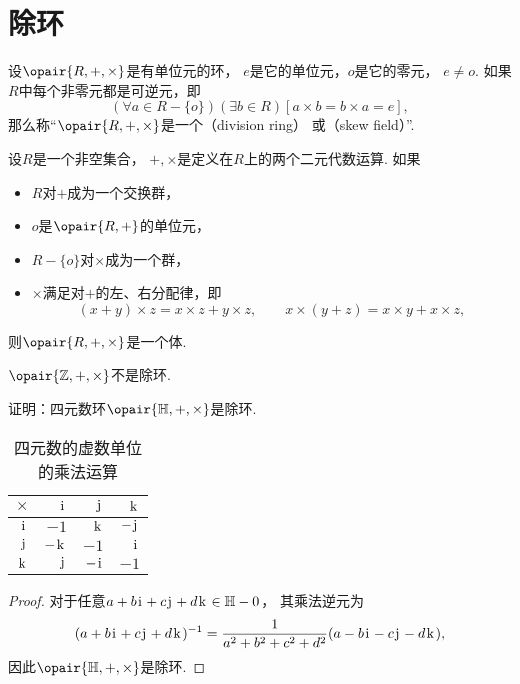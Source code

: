 \section{除环}
\begin{definition}
设\(\opair{R,+,\times}\)是有单位元的环，
\(e\)是它的单位元，\(o\)是它的零元，
\(e \neq o\).
如果\(R\)中每个非零元都是可逆元，即\begin{equation*}
	(\forall a \in R-\{o\})(\exists b \in R)[a \times b = b \times a = e],
\end{equation*}
那么称“\(\opair{R,+,\times}\)是一个（division ring）
或（skew field）”.
\end{definition}

\begin{theorem}
设\(R\)是一个非空集合，
\(+,\times\)是定义在\(R\)上的两个二元代数运算.
如果\begin{itemize}
	\item \(R\)对\(+\)成为一个交换群，
	\item \(o\)是\(\opair{R,+}\)的单位元，
	\item \(R-\{o\}\)对\(\times\)成为一个群，
	\item \(\times\)满足对\(+\)的左、右分配律，即\begin{equation*}
		(x + y) \times z = x \times z + y \times z,
		\qquad
		x \times (y + z) = x \times y + x \times z,
	\end{equation*}
\end{itemize}
则\(\opair{R,+,\times}\)是一个体.
\end{theorem}

\begin{example}
\(\opair{\mathbb{Z},+,\times}\)不是除环.
\end{example}

\begin{example}
证明：四元数环\(\opair{\mathbb{H},+,\times}\)是除环.
\begin{table}[hbt]
	\centering
	\begin{tabular}{r|*3r}
		\(\times\) & \(\kern1pt\mathrm{i}\kern1pt\) & \(\kern1pt\mathrm{j}\kern1pt\) & \(\kern1pt\mathrm{k}\kern1pt\) \\ \hline
		\(\kern1pt\mathrm{i}\kern1pt\) & \(-1\) & \(\kern1pt\mathrm{k}\kern1pt\) & \(-\kern1pt\mathrm{j}\kern1pt\) \\
		\(\kern1pt\mathrm{j}\kern1pt\) & \(-\kern1pt\mathrm{k}\kern1pt\) & \(-1\) & \(\kern1pt\mathrm{i}\kern1pt\) \\
		\(\kern1pt\mathrm{k}\kern1pt\) & \(\kern1pt\mathrm{j}\kern1pt\) & \(-\kern1pt\mathrm{i}\kern1pt\) & \(-1\) \\
	\end{tabular}
	\caption{四元数的虚数单位的乘法运算}
\end{table}
\begin{proof}
对于任意\(a+b\kern1pt\mathrm{i}\kern1pt+c\kern1pt\mathrm{j}\kern1pt+d\kern1pt\mathrm{k}\kern1pt\in\mathbb{H}-0\)，
其乘法逆元为\begin{equation*}
	(a+b\kern1pt\mathrm{i}\kern1pt+c\kern1pt\mathrm{j}\kern1pt+d\kern1pt\mathrm{k}\kern1pt)^{-1}
	= \frac1{a^2+b^2+c^2+d^2} (a-b\kern1pt\mathrm{i}\kern1pt-c\kern1pt\mathrm{j}\kern1pt-d\kern1pt\mathrm{k}\kern1pt),
\end{equation*}
因此\(\opair{\mathbb{H},+,\times}\)是除环.
\end{proof}
\end{example}

